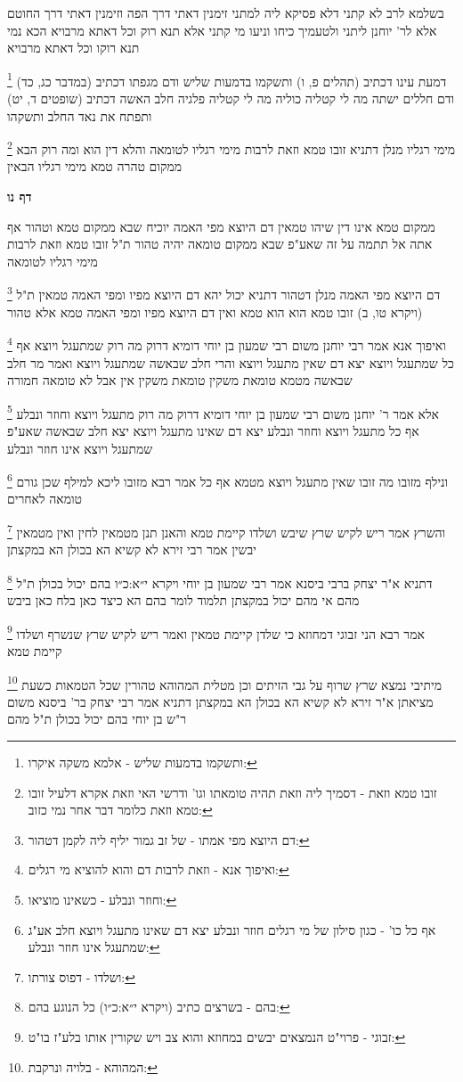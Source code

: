 \documentclass[12pt, openany]{book}
\newcommand{\sethebfont}{
\fontsize{10.5pt}{21.0pt} \selectfont
}
\newcommand{\twocol}[1]{
	{\sethebfont \begin{multicols}{2}
			#1
	\end{multicols}}	
}
\newcommand{\sectname}{}
\newcommand{\newsection}[1]{
	\renewcommand{\sectname}{#1}	
	\vspace{-\baselineskip}
	\begin{center}
		\textbf{%
\fontsize{16pt}{16pt}\selectfont
			#1}
	\end{center}
	\vspace{-\baselineskip}
	\nopagebreak
}
\newcommand{\footnotecomment}[1]{
	\renewcommand\thefootnote{}
	\footnote{#1}}
\newcommand{\commenta}[1]{\footnotecomment{#1}}
\begin{document}
{בשלמא לרב לא קתני דלא פסיקא ליה למתני זימנין דאתי דרך הפה וזימנין דאתי דרך החוטם אלא לר' יוחנן ליתני 
ולטעמיך כיחו וניעו מי קתני אלא תנא רוק וכל דאתא מרבויא הכא נמי תנא רוקו וכל דאתא מרבויא 
\commenta{ותשקמו בדמעות שליש - אלמא משקה איקרו:}
דמעת עינו דכתיב (תהלים פ, ו) ותשקמו בדמעות שליש ודם מגפתו דכתיב (במדבר כג, כד) ודם חללים ישתה מה לי קטליה כוליה מה לי קטליה פלגיה חלב האשה דכתיב (שופטים ד, יט) ותפתח את נאד החלב ותשקהו 
\commenta{זובו טמא וזאת - דסמיך ליה וזאת תהיה טומאתו וגו' ודרשי האי וזאת אקרא דלעיל זובו טמא וזאת כלומר דבר אחר נמי כזוב:}
מימי רגליו מנלן דתניא זובו טמא וזאת לרבות מימי רגליו לטומאה והלא דין הוא ומה רוק הבא ממקום טהרה טמא מימי רגליו הבאין
\clearpage}

\newsection{דף נו}
\twocol{ממקום טמא אינו דין שיהו טמאין דם היוצא מפי האמה יוכיח שבא ממקום טמא וטהור אף אתה אל תתמה על זה שאע"פ שבא ממקום טומאה יהיה טהור ת"ל זובו טמא וזאת לרבות מימי רגליו לטומאה 
\commenta{דם היוצא מפי אמתו - של זב גמור יליף ליה לקמן דטהור:}
דם היוצא מפי האמה מנלן דטהור דתניא יכול יהא דם היוצא מפיו ומפי האמה טמאין ת"ל (ויקרא טו, ב) זובו טמא הוא הוא טמא ואין דם היוצא מפיו ומפי האמה טמא אלא טהור 
\commenta{ואיפוך אנא - וזאת לרבות דם והוא להוציא מי רגלים:}
ואיפוך אנא אמר רבי יוחנן משום רבי שמעון בן יוחי דומיא דרוק מה רוק שמתעגל ויוצא אף כל שמתעגל ויוצא יצא דם שאין מתעגל ויוצא 
והרי חלב שבאשה שמתעגל ויוצא ואמר מר חלב שבאשה מטמא טומאת משקין טומאת משקין אין אבל לא טומאה חמורה 
\commenta{וחוזר ונבלע - כשאינו מוציאו:}
אלא אמר ר' יוחנן משום רבי שמעון בן יוחי דומיא דרוק מה רוק מתעגל ויוצא וחוזר ונבלע אף כל מתעגל ויוצא וחוזר ונבלע יצא דם שאינו מתעגל ויוצא יצא חלב שבאשה שאע"פ שמתעגל ויוצא אינו חוזר ונבלע 
\commenta{אף כל כו' - כגון סילון של מי רגלים חוזר ונבלע יצא דם שאינו מתעגל ויוצא חלב אע"ג שמתעגל אינו חוזר ונבלע:}
ונילף מזובו מה זובו שאין מתעגל ויוצא מטמא אף כל אמר רבא מזובו ליכא למילף שכן גורם טומאה לאחרים
\commenta{ושלדו - דפוס צורתו:}
והשרץ אמר ריש לקיש שרץ שיבש ושלדו קיימת טמא והאנן תנן מטמאין לחין ואין מטמאין יבשין אמר רבי זירא לא קשיא הא בכולן הא במקצתן 
\commenta{בהם - בשרצים כתיב (ויקרא י״א:כ״ו) כל הנוגע בהם:}
דתניא א"ר יצחק ברבי ביסנא אמר רבי שמעון בן יוחי {ויקרא י״א:כ״ו } בהם יכול בכולן ת"ל מהם 
אי מהם יכול במקצתן תלמוד לומר בהם הא כיצד כאן בלח כאן ביבש 
\commenta{זבוגי - פרוי"ט הנמצאים יבשים במחוזא והוא צב ויש שקורין אותו בלע"ז בו"ט:}
אמר רבא הני זבוגי דמחוזא כי שלדן קיימת טמאין ואמר ריש לקיש שרץ שנשרף ושלדו קיימת טמא 
\commenta{המהוהא - בלויה ונרקבת:}
מיתיבי נמצא שרץ שרוף על גבי הזיתים וכן מטלית המהוהא טהורין שכל הטמאות כשעת מציאתן א"ר זירא לא קשיא הא בכולן הא במקצתן 
דתניא אמר רבי יצחק בר' ביסנא משום ר"ש בן יוחי בהם יכול בכולן ת"ל מהם 
}
\end{document}
